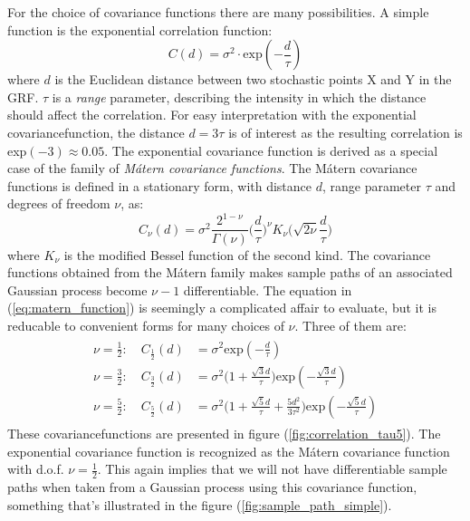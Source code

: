 For the choice of covariance functions there are many possibilities. A simple function is the exponential correlation function:
\begin{equation*}
C(d) = \sigma^2 \cdot \text{exp}(-\frac{d}{\tau})
\end{equation*}
where $d$ is the Euclidean distance between two stochastic points X and Y in the GRF. $\tau$ is a \textit{range} parameter, describing the intensity in which the distance should affect the correlation. For easy interpretation with the exponential covariancefunction, the distance $d = 3\tau$ is of interest as the resulting correlation is exp$(-3) \approx 0.05$.
The exponential covariance function is derived as a special case of the family of \textit{Mátern covariance functions}. The Mátern covariance functions is defined in a stationary form, with distance $d$, range parameter $\tau$ and degrees of freedom $\nu$, as:
\begin{equation} \label{eq:matern_function}
C_{\nu}(d) = \sigma^2 \frac{2^{1-\nu}}{\Gamma(\nu)}\bigg( \frac{d}{\tau} \bigg)^{\nu} K_{\nu} \bigg( \sqrt{2\nu}\frac{d}{\tau} \bigg)
\end{equation}
where $K_{\nu}$ is the modified Bessel function of the second kind. The covariance functions obtained from the Mátern family makes sample paths of an associated Gaussian process become $\nu - 1$ differentiable. The equation in (\ref{eq:matern_function}) is seemingly a complicated affair to evaluate, but it is reducable to convenient forms for many choices of $\nu$. Three of them are:
\begin{align} \label{eq:covariance_functions}
\begin{split}
\nu = \frac{1}{2}: \quad C_{\frac{1}{2}}(d) &= \sigma^2\text{exp}(-\frac{d}{\tau}) \\
\nu = \frac{3}{2}: \quad C_{\frac{3}{2}}(d) &= \sigma^2 \bigg(1  +
\frac{\sqrt{3}d}{\tau} \bigg) \text{exp}(-\frac{\sqrt{3}d}{\tau}) \\
\nu = \frac{5}{2}: \quad C_{\frac{5}{2}}(d) &= \sigma^2 \bigg(1  +
\frac{\sqrt{5}d}{\tau} + \frac{5d^2}{3\tau^2}\bigg) \text{exp}(-\frac{\sqrt{5}d}{\tau})
\end{split}
\end{align}
These covariancefunctions are presented in figure (\ref{fig:correlation_tau5}). The exponential covariance function is recognized as the Mátern covariance function with d.o.f. $\nu = \frac{1}{2}$. This again implies that we will not have differentiable sample paths when taken from a Gaussian process using this covariance function, something that's illustrated in the figure (\ref{fig:sample_path_simple}).  

